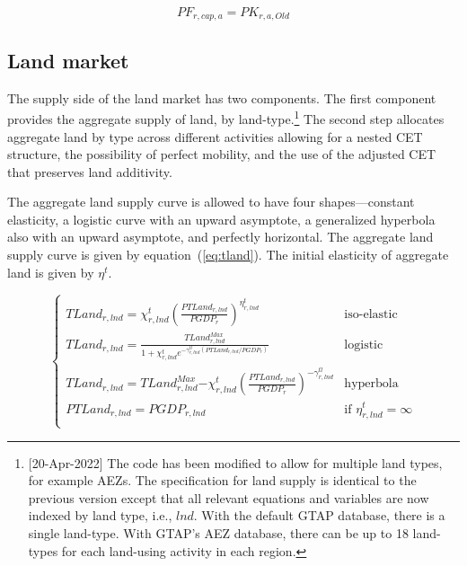 \documentclass[11pt,letterpaper]{report}
\begin{document}
\begin{equation}
\label{eq:pfcap}
\mathit{PF}_{r,cap,a} = \mathit{PK}_{r,a,\mathit{Old}}
\end{equation}

\subsection{Land market}

The supply side of the land market has two components. The first component
provides the aggregate supply of land, by land-type.\footnote{[20-Apr-2022]
The code has been modified to allow for multiple land types, for example
AEZs. The specification for land supply is identical to the previous
version except that all relevant equations and variables are now
indexed by land type, i.e., $\mathit{lnd}$. With the default GTAP
database, there is a single land-type. With GTAP's AEZ database, there
can be up to 18 land-types for each land-using activity in each region.}
The second step allocates aggregate land by type
across different activities allowing for a nested CET structure, the possibility
of perfect mobility, and the use of the adjusted CET that preserves land
additivity.

The aggregate land supply curve is allowed to have four shapes---constant
elasticity, a logistic curve with an upward asymptote, a generalized hyperbola
also with an upward asymptote, and perfectly horizontal. The aggregate land
supply curve is given by equation~(\ref{eq:tland}). The initial elasticity of
aggregate land is given by $\eta^t$.

\begin{equation}
\label{eq:tland}
\begin{cases}
   \displaystyle \mathit{TLand}_{r,\mathit{lnd}} =
      \chi^t_{r,\mathit{lnd}} \left( \frac{\mathit{PTLand}_{r,\mathit{lnd}}} {\mathit{PGDP}_r}
      \right)^{\eta^t_{r,\mathit{lnd}}}
   & \textrm{iso-elastic} \\
   \displaystyle \mathit{TLand}_{r,\mathit{lnd}} =
      \frac {\mathit{TLand}^{\mathit{Max}}_{r,\mathit{lnd}}}
            {1 + \chi^t_{r,\mathit{lnd}} e^{-\gamma^{\mathit{tl}}_{r,\mathit{lnd}}
               (\mathit{PTLand}_{r,\mathit{lnd}}/\mathit{PGDP}_r)}}
   & \textrm{logistic} \\
   \displaystyle \mathit{TLand}_{r,\mathit{lnd}} =
      {\mathit{TLand}^{\mathit{Max}}_{r,\mathit{lnd}}} {- \chi^t_{r,\mathit{lnd}}
      \left( \frac{\mathit{PTLand}_{r,\mathit{lnd}}} {\mathit{PGDP}_r}
      \right)^{-\gamma^{\mathit{tl}}_{r,\mathit{lnd}}}}
   & \textrm{hyperbola} \\
   \displaystyle \mathit{PTLand}_{r,\mathit{lnd}} = \mathit{PGDP}_{r,\mathit{lnd}}
   & \textrm{if } \eta^t_{r,\mathit{lnd}} = \infty \\
\end{cases}
\end{equation}
\end{document}
